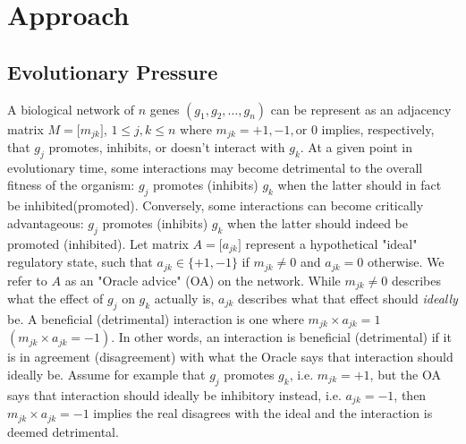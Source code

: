 %

%
\section{Approach} \label{approach}	
\subsection{Evolutionary Pressure}		
A biological network of $n$ genes $(g_1, g_2,\dots, g_n)$ can be represent as an adjacency matrix 
$M=\big [m_{jk}\big ]$, $1\leq j,k\leq n$ where $m_{jk} = +1, -1,\text{or } 0$ implies, respectively,  
that $g_j$ promotes, inhibits, or doesn't interact with $g_k$. At a given point in evolutionary time,
some interactions may become detrimental to the overall fitness of the organism: $g_j$ promotes (inhibits) $g_k$ when the latter should
in fact be inhibited(promoted). Conversely, some interactions can become critically advantageous: $g_j$ promotes (inhibits) $g_k$ when the latter should
indeed be promoted (inhibited). 
Let matrix $A=\big [a_{jk}\big ]$ represent a hypothetical "ideal" regulatory state, such that 
$a_{jk}\in\{+1,-1\}$ if $m_{jk}\neq 0$ and $a_{jk}=0$ otherwise. We refer to $A$ as an "Oracle advice" (OA) on the network. 
While $m_{jk}\neq 0$ describes what the effect of $g_j$ 
on $g_k$ actually is, $a_{jk}$ describes what that effect should \textit{ideally} be. A beneficial (detrimental) interaction
is one where $m_{jk} \times a_{jk} = 1 $ $(m_{jk}\times a_{jk}=-1)$. In other words, an interaction is beneficial (detrimental)
if it is in agreement (disagreement) with what the Oracle says that interaction should ideally be. 
Assume for example that $g_j$ promotes $g_k$, i.e. $m_{jk}=+1$, 
but the OA says that interaction should ideally be inhibitory instead, i.e. $a_{jk}=-1$, then $m_{jk}\times a_{jk}=-1$ implies
the real disagrees with the ideal and the interaction is deemed detrimental. 

